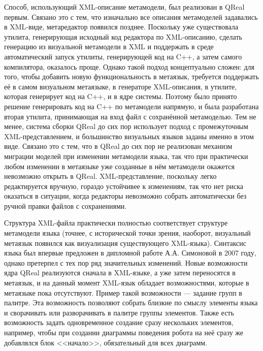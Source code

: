 Способ, использующий XML-описание метамодели, был реализован в QReal первым. Связано 
это с тем, что изначально все описания метамоделей задавались в XML-виде, метаредактор 
появился позднее. Поскольку уже существовала утилита, генерирующая исходный код редактора 
по XML-описанию, сделать генерацию из визуальной метамодели в XML и поддержать в среде 
автоматический запуск утилиты, генерирующей код на C++, а затем самого компилятора, 
оказалось проще. Однако такой подход концептуально сложен: для того, чтобы добавить 
новую функциональность в метаязык, требуется поддержать её в самом визуальном метаязыке, 
в генераторе XML-описания, в утилите, которая генерирует код на C++, и в ядре системы. 
Поэтому было принято решение генерировать код на C++ по метамодели напрямую, и была 
разработана вторая утилита,  принимающая на вход файл с сохранённой метамоделью. Тем 
не менее, система сборки QReal до сих пор использует подход с промежуточным XML-представлением, 
и большинство визуальных языков заданы именно в этом виде. Связано это с тем, что в 
QReal до сих пор не реализован механизм миграции моделей при изменении метамодели 
языка, так что при практически любом изменении в метаязыке уже созданные в нём метамодели 
окажется невозможно открыть в QReal. XML-представление, поскольку легко редактируется 
вручную, гораздо устойчивее к изменениям, так что нет риска оказаться в ситуации, когда 
редакторы невозможно собрать автоматически без ручной правки файлов с сохранениями. 

Структура XML-файла практически полностью соответствует структуре метамодели языка 
(точнее, с исторической точки зрения, наоборот, визуальный метаязык появился как визуализация 
существующего XML-языка). Синтаксис языка был впервые предложен в дипломной работе А.А. Симоновой в 2007 году, 
однако претерпел с тех пор ряд значительных изменений. Новые возможности ядра QReal 
реализуются сначала в XML-языке, а уже затем переносятся в метаязык, и на данный момент 
XML-язык обладает возможностями, которые в метаязыке пока отсутствуют. Пример такой 
возможности --- задание групп в палитре. Эта возможность позволяют собрать близкие 
по смыслу элементы языка и сворачивать или разворачивать в палитре группы элементов. 
Также есть возможность задать одновременное создание сразу нескольких элементов, например, 
чтобы при создании диаграммы поведения робота на неё сразу же добавлялся блок <<начало>>, 
обязательный для всех диаграмм.

